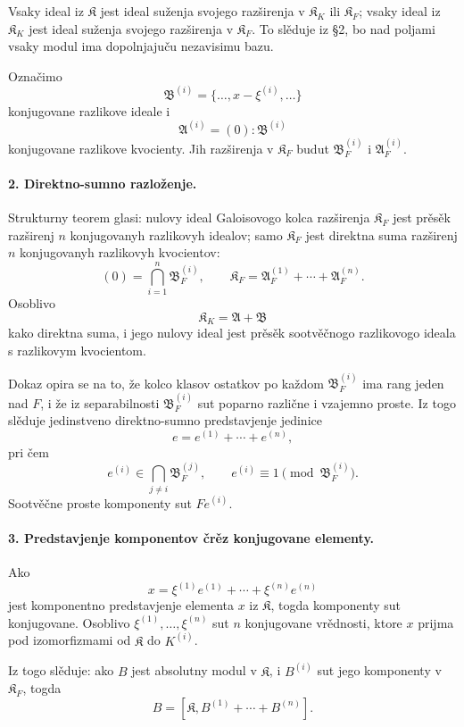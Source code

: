 \documentclass[11pt]{article}
\begin{document}
Vsaky ideal iz \(\mathfrak K\) jest ideal suženja svojego razširenja v \(\mathfrak K_K\) ili \(\mathfrak K_F\); vsaky ideal iz \(\mathfrak K_K\) jest ideal suženja svojego razširenja v \(\mathfrak K_F\). To slěduje iz §2, bo nad poljami vsaky modul ima dopolnjajuču nezavisimu bazu.

Označimo
\[
        \mathfrak B^{(i)}=\{\ldots,x-\xi^{(i)},\ldots\}
\]
konjugovane razlikove ideale i
\[
        \mathfrak A^{(i)}=(0):\mathfrak B^{(i)}
\]
konjugovane razlikove kvocienty. Jih razširenja v \(\mathfrak K_F\) budut \(\mathfrak B_F^{(i)}\) i \(\mathfrak A_F^{(i)}\).

\paragraph{2. Direktno-sumno razloženje.}
Strukturny teorem glasi: nulovy ideal Galoisovogo kolca razširenja \(\mathfrak K_F\) jest prěsěk razširenj \(n\) konjugovanyh razlikovyh idealov; samo \(\mathfrak K_F\) jest direktna suma razširenj \(n\) konjugovanyh razlikovyh kvocientov:
\[
        (0)=\bigcap_{i=1}^n \mathfrak B_F^{(i)},
        \qquad
        \mathfrak K_F=\mathfrak A_F^{(1)}+\cdots+\mathfrak A_F^{(n)}.
\]
Osoblivo
\[
        \mathfrak K_K=\mathfrak A+\mathfrak B
\]
kako direktna suma, i jego nulovy ideal jest prěsěk sootvěčnogo razlikovogo ideala s razlikovym kvocientom.

Dokaz opira se na to, že kolco klasov ostatkov po každom \(\mathfrak B_F^{(i)}\) ima rang jeden nad \(F\), i že iz separabilnosti \(\mathfrak B_F^{(i)}\) sut poparno različne i vzajemno proste. Iz togo slěduje jedinstveno direktno-sumno predstavjenje jedinice
\[
        e=e^{(1)}+\cdots+e^{(n)},
\]
pri čem
\[
        e^{(i)}\in \bigcap_{j\ne i}\mathfrak B_F^{(j)},
        \qquad
        e^{(i)}\equiv 1\pmod{\mathfrak B_F^{(i)}}.
\]
Sootvěčne proste komponenty sut \(Fe^{(i)}\).

\paragraph{3. Predstavjenje komponentov črěz konjugovane elementy.}
Ako
\[
        x=\xi^{(1)}e^{(1)}+\cdots+\xi^{(n)}e^{(n)}
\]
jest komponentno predstavjenje elementa \(x\) iz \(\mathfrak K\), togda komponenty sut konjugovane. Osoblivo \(\xi^{(1)},\ldots,\xi^{(n)}\) sut \(n\) konjugovane vrědnosti, ktore \(x\) prijma pod izomorfizmami od \(\mathfrak K\) do \(K^{(i)}\).

Iz togo slěduje: ako \(B\) jest absolutny modul v \(\mathfrak K\), i \(B^{(i)}\) sut jego komponenty v \(\mathfrak K_F\), togda
\[
        B=[\mathfrak K,B^{(1)}+\cdots+B^{(n)}].
\]
\end{document}
